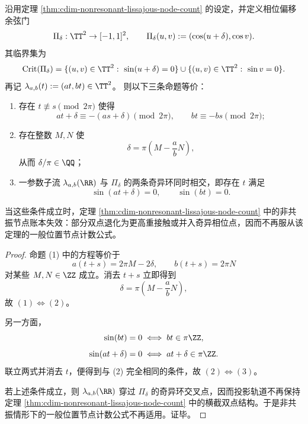 \begin{proposition}\label{prop:cdim-lissajous-resonant-phase-critical-ring-equivalence}
沿用定理 \ref{thm:cdim-nonresonant-lissajous-node-count} 的设定，并定义相位偏移余弦门
\[
\Pi_\delta:\TT^2\to[-1,1]^2,
\qquad
\Pi_\delta(u,v):=(\cos(u+\delta),\cos v).
\]
其临界集为
\[
\operatorname{Crit}(\Pi_\delta)
=
\{(u,v)\in\TT^2:\ \sin(u+\delta)=0\}\cup \{(u,v)\in\TT^2:\ \sin v=0\}.
\]
再记 \(\lambda_{a,b}(t):=(at,bt)\in\TT^2\)。
则以下三条命题等价：
\begin{enumerate}
  \item 存在 \(t\not\equiv s\pmod{2\pi}\) 使得
  \[
  at+\delta\equiv -(as+\delta)\pmod{2\pi},
  \qquad
  bt\equiv -bs\pmod{2\pi};
  \]
  \item 存在整数 \(M,N\) 使
  \[
  \delta=\pi\left(M-\frac{a}{b}N\right),
  \]
  从而 \(\delta/\pi\in\QQ\)；
  \item 一参数子流 \(\lambda_{a,b}(\RR)\) 与 \(\Pi_\delta\) 的两条奇异环同时相交，即存在 \(t\) 满足
  \[
  \sin(at+\delta)=0,
  \qquad
  \sin(bt)=0.
  \]
\end{enumerate}
当这些条件成立时，定理 \ref{thm:cdim-nonresonant-lissajous-node-count} 中的非共振节点账本失效：部分双点退化为更高重接触或并入奇异相位点，因而不再服从该定理的一般位置节点计数公式。
\end{proposition}
\begin{proof}
命题 (1) 中的方程等价于
\[
a(t+s)=2\pi M-2\delta,
\qquad
b(t+s)=2\pi N
\]
对某些 \(M,N\in\ZZ\) 成立。消去 \(t+s\) 立即得到
\[
\delta=\pi\left(M-\frac{a}{b}N\right),
\]
故 \((1)\Leftrightarrow(2)\)。

另一方面，
\[
\sin(bt)=0
\iff
bt\in\pi\ZZ,
\]
\[
\sin(at+\delta)=0
\iff
at+\delta\in\pi\ZZ.
\]
联立两式并消去 \(t\)，便得到与 (2) 完全相同的条件，故 \((2)\Leftrightarrow(3)\)。

若上述条件成立，则 \(\lambda_{a,b}(\RR)\) 穿过 \(\Pi_\delta\) 的奇异环交叉点，因而投影轨道不再保持定理 \ref{thm:cdim-nonresonant-lissajous-node-count} 中的横截双点结构。于是非共振情形下的一般位置节点计数公式不再适用。证毕。
\end{proof}

\endinput
